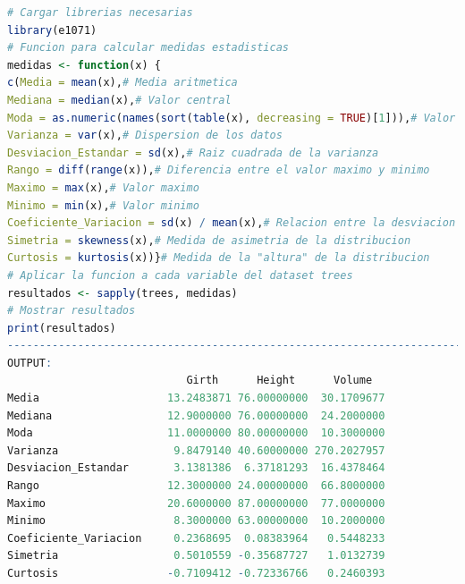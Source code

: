 \documentclass{article}
\begin{document}
\begin{lstlisting}[language=R, caption=Medidas]
# Cargar librerias necesarias
library(e1071)  
# Funcion para calcular medidas estadisticas
medidas <- function(x) {
c(Media = mean(x),# Media aritmetica
Mediana = median(x),# Valor central
Moda = as.numeric(names(sort(table(x), decreasing = TRUE)[1])),# Valor mas frecuente
Varianza = var(x),# Dispersion de los datos
Desviacion_Estandar = sd(x),# Raiz cuadrada de la varianza
Rango = diff(range(x)),# Diferencia entre el valor maximo y minimo
Maximo = max(x),# Valor maximo
Minimo = min(x),# Valor minimo
Coeficiente_Variacion = sd(x) / mean(x),# Relacion entre la desviacion estandar y la media
Simetria = skewness(x),# Medida de asimetria de la distribucion
Curtosis = kurtosis(x))}# Medida de la "altura" de la distribucion  
# Aplicar la funcion a cada variable del dataset trees
resultados <- sapply(trees, medidas)
# Mostrar resultados
print(resultados)
------------------------------------------------------------------------------------
OUTPUT:
                            Girth      Height      Volume
Media                    13.2483871 76.00000000  30.1709677
Mediana                  12.9000000 76.00000000  24.2000000
Moda                     11.0000000 80.00000000  10.3000000
Varianza                  9.8479140 40.60000000 270.2027957
Desviacion_Estandar       3.1381386  6.37181293  16.4378464
Rango                    12.3000000 24.00000000  66.8000000
Maximo                   20.6000000 87.00000000  77.0000000
Minimo                    8.3000000 63.00000000  10.2000000
Coeficiente_Variacion     0.2368695  0.08383964   0.5448233
Simetria                  0.5010559 -0.35687727   1.0132739
Curtosis                 -0.7109412 -0.72336766   0.2460393
\end{lstlisting}
\newpage
\end{document}
